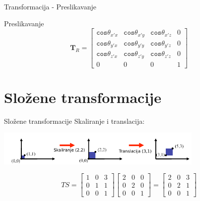 \documentclass[9pt]{beamer}
\begin{document}
\begin{frame}{Transformacija - Preslikavanje}
	\begin{block}{Preslikavanje}
		\[    \mathbf{T}_{R} = \left[ \begin{array}{cccc}
		\mathtt{cos}\theta_{x'x} & \mathtt{cos}\theta_{x'y} & \mathtt{cos}\theta_{x'z} & 0 \\
		\mathtt{cos}\theta_{y'x} & \mathtt{cos}\theta_{y'y} & \mathtt{cos}\theta_{y'z} & 0 \\
		\mathtt{cos}\theta_{z'x} & \mathtt{cos}\theta_{z'y} & \mathtt{cos}\theta_{z'z} & 0 \\
		0 & 0 & 0 & 1 
		\end{array} \right] \]
	\end{block}
\end{frame}

\section{Složene transformacije}
\begin{frame}{Složene transformacije}
	Skaliranje i translacija:
	\begin{center}
		\includegraphics[width=10cm]{slike/slozene_transformacije_01.png}
	\end{center}
	$$ TS = \left[ \begin{array}{ccc}
	1 & 0 & 3 \\
	0 & 1 & 1  \\
	0 & 0 & 1 
	\end{array} \right]
	\left[ \begin{array}{ccc}
	2 & 0 & 0 \\
	0 & 2 & 0  \\
	0 & 0 & 1 
	\end{array} \right] = 
	\left[ \begin{array}{ccc}
	2 & 0 & 3 \\
	0 & 2 & 1  \\
	0 & 0 & 1 
	\end{array} \right]
	$$
\end{frame}
\end{document}
